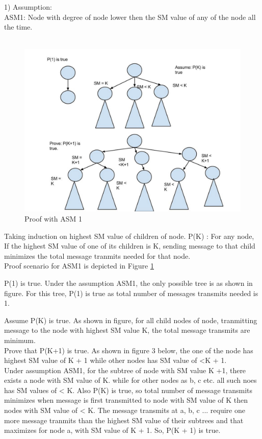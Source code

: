 1) Assumption: \\ ASM1: Node with degree of node lower then the SM value of any of the node all the time.\\\ 

\begin{figure}[4c]
    \centering
    \includegraphics[scale=0.10]{4c}
    \caption{Proof with ASM 1}
    \label{fig:4c}
\end{figure}

Taking induction on highest SM value of children of node. 
P(K) : For any node, If the highest SM value of one of its children is K, sending message to that child minimizes the total message tranmits needed for that node.\\ 

Proof scenario for ASM1 is depicted in Figure \ref{fig:4c}

P(1) is true. Under the assumption ASM1, the only possible tree is as shown in figure.
For this tree, P(1) is true as total number of messages transmits needed is 1. 

Assume P(K) is true.  As shown in figure, for all child nodes of node, tranmitting message to the node with highest SM value K, the total message transmits are minimum.\\

Prove that P(K+1) is true. As shown in figure 3 below, the one of the node has highest SM value of K + 1 while other nodes has SM value of <K + 1. \\

Under assumption ASM1, for the subtree of node with SM value K +1, there exists a node with SM value of K. while for other nodes as b, c etc. all such noes has SM values of < K. Also P(K) is true, so total number of message transmits minimizes when message is first transmitted to node with SM value of K then nodes with SM value of < K. The message transmits at a, b, c ... require one more message tranmits than the highest SM value of their subtrees and that maximizes for node a, with SM value of K + 1. So, P(K + 1) is true. \\

